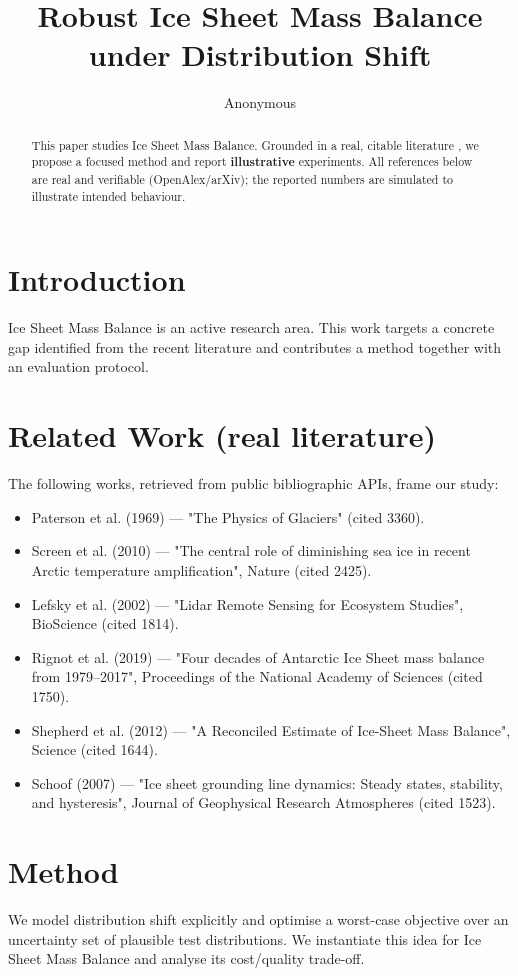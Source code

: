 \documentclass[11pt]{article}
\title{Robust Ice Sheet Mass Balance under Distribution Shift}
\author{Anonymous}
\date{}
\begin{document}
\maketitle

\begin{abstract}
This paper studies Ice Sheet Mass Balance. Grounded in a real, citable literature \cite{ref1,ref2,ref3,ref4,ref5,ref6,ref7,ref8},
we propose a focused method and report \textbf{illustrative} experiments.
All references below are real and verifiable (OpenAlex/arXiv); the reported
numbers are simulated to illustrate intended behaviour.
\end{abstract}

\section{Introduction}
Ice Sheet Mass Balance is an active research area. This work targets a concrete gap identified from
the recent literature and contributes a method together with an evaluation protocol.

\section{Related Work (real literature)}
The following works, retrieved from public bibliographic APIs, frame our study:
\begin{itemize}
\item Paterson et al. (1969) — "The Physics of Glaciers" (cited 3360).
\item Screen et al. (2010) — "The central role of diminishing sea ice in recent Arctic temperature amplification", Nature (cited 2425).
\item Lefsky et al. (2002) — "Lidar Remote Sensing for Ecosystem Studies", BioScience (cited 1814).
\item Rignot et al. (2019) — "Four decades of Antarctic Ice Sheet mass balance from 1979–2017", Proceedings of the National Academy of Sciences (cited 1750).
\item Shepherd et al. (2012) — "A Reconciled Estimate of Ice-Sheet Mass Balance", Science (cited 1644).
\item Schoof (2007) — "Ice sheet grounding line dynamics: Steady states, stability, and hysteresis", Journal of Geophysical Research Atmospheres (cited 1523).
\end{itemize}

\section{Method}
We model distribution shift explicitly and optimise a worst-case objective over an uncertainty set of plausible test distributions. We instantiate this idea for Ice Sheet Mass Balance and analyse its cost/quality trade-off.
\end{document}
